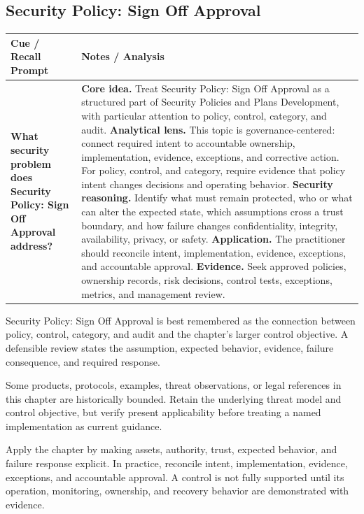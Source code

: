 \documentclass[11pt]{article}
\newcommand{\CornellHeader}{%
\rowcolor{Navy}\color{white}\bfseries Cue / Recall Prompt & \color{white}\bfseries Notes / Analysis\\\hline}
\newcommand{\CornellRow}[2]{%
\cellcolor{CueGray}\RaggedRight\textbf{#1} & \RaggedRight #2\\\hline}
\begin{document}
\subsection*{Security Policy: Sign Off Approval}
\begin{longtable}{>{\RaggedRight\arraybackslash}p{}|>{\RaggedRight\arraybackslash}p{}}
\CornellHeader
\CornellRow{What security problem does Security Policy: Sign Off Approval address?}{\textbf{Core idea.} Treat Security Policy: Sign Off Approval as a structured part of Security Policies and Plans Development, with particular attention to policy, control, category, and audit. \textbf{Analytical lens.} This topic is governance-centered: connect required intent to accountable ownership, implementation, evidence, exceptions, and corrective action. For policy, control, and category, require evidence that policy intent changes decisions and operating behavior. \textbf{Security reasoning.} Identify what must remain protected, who or what can alter the expected state, which assumptions cross a trust boundary, and how failure changes confidentiality, integrity, availability, privacy, or safety. \textbf{Application.} The practitioner should reconcile intent, implementation, evidence, exceptions, and accountable approval. \textbf{Evidence.} Seek approved policies, ownership records, risk decisions, control tests, exceptions, metrics, and management review.}
\end{longtable}
\begin{topicsummary}
Security Policy: Sign Off Approval is best remembered as the connection between policy, control, category, and audit and the chapter's larger control objective. A defensible review states the assumption, expected behavior, evidence, failure consequence, and required response.
\end{topicsummary}
\begin{historybox}
Some products, protocols, examples, threat observations, or legal references in this chapter are historically bounded. Retain the underlying threat model and control objective, but verify present applicability before treating a named implementation as current guidance.
\end{historybox}
\begin{defensebox}
Apply the chapter by making assets, authority, trust, expected behavior, and failure response explicit. In practice, reconcile intent, implementation, evidence, exceptions, and accountable approval. A control is not fully supported until its operation, monitoring, ownership, and recovery behavior are demonstrated with evidence.
\end{defensebox}
\end{document}
